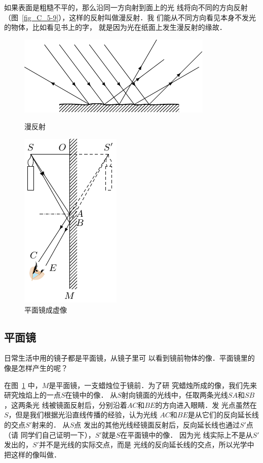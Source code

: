 如果表面是粗糙不平的，那么沿同一方向射到面上的光
线将向不同的方向反射（图~\ref{fig_C_5-9}），这样的反射叫做漫反射．我
们能从不同方向看见本身不发光的物体，比如看见书上的字，
就是因为光在纸面上发生漫反射的缘故．
\begin{figure}[htbp]
    \centering
    \begin{minipage}[t]{0.48\textwidth}
        \centering
        \includegraphics{fig/C/5-9.pdf}
        \caption{漫反射}\label{fig_C_5-9}
    \end{minipage}
    \begin{minipage}[t]{0.48\textwidth}
        \centering
        \includegraphics{fig/C/5-10.pdf}
        \caption{平面镜成虚像}\label{fig_C_5-10}
    \end{minipage}
\end{figure}

\subsection{平面镜}

日常生活中用的镜子都是平面镜，从镜子里可
以看到镜前物体的像．平面镜里的像是怎样产生的呢？

在图~\ref{fig_C_5-10} 中，$M$是平面镜，一支蜡烛位于镜前．为了研
究蜡烛所成的像，我们先来研究烛焰上的一点$S$在镜中的像．
从$S$射向镜面的光线中，任取两条光线$SA$和$SB$，这两条光
线被镜面反射后，分别沿着$AC$和$BE$的方向进入眼睛．发
光点虽然在$S$，但是我们根据光沿直线传播的经验，认为光线
$AC$和$BE$是从它们的反向延长线的交点$S'$射来的．
从$S$点
发出的其他光线经镜面反射后，反向延长线也通过$S'$点（请
同学们自己证明一下），$S'$就是$S$在平面镜中的像．
因为光
线实际上不是从$S'$发出的，$S'$并不是光线的实际交点，而是
光线的反向延长线的交点，所以光学中把这样的像叫做．

